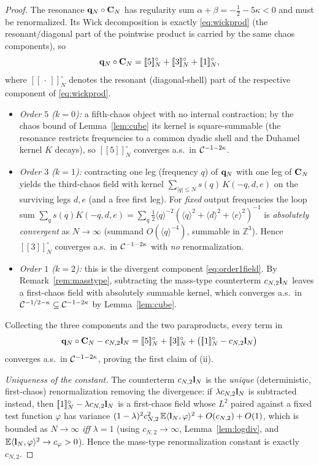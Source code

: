 \begin{proof}
The resonance $\mathbf{q}_N\circ\mathbf{C}_N$ has regularity sum
$\alpha+\beta=-\tfrac12-5\kappa<0$ and must be renormalized. Its Wick decomposition is
exactly \eqref{eq:wickprod} (the resonant/diagonal part of the pointwise product is
carried by the same chaos components), so
\begin{equation}\label{eq:resdecomp}
\mathbf{q}_N\circ\mathbf{C}_N=[\![5]\!]^{\circ}_N+[\![3]\!]^{\circ}_N+[\![1]\!]^{\circ}_N,
\end{equation}
where $[\![\,\cdot\,]\!]^{\circ}_N$ denotes the resonant (diagonal-shell) part of the
respective component of \eqref{eq:wickprod}.
\begin{itemize}
\item \emph{Order $5$ ($k=0$):} a fifth-chaos object with no internal contraction; by
the chaos bound of Lemma~\ref{lem:cube} its kernel is square-summable (the resonance
restricts frequencies to a common dyadic shell and the Duhamel kernel $K$ decays), so
$[\![5]\!]^{\circ}_N$ converges a.s.\ in $\mathcal{C}^{-1-2\kappa}$.
\item \emph{Order $3$ ($k=1$):} contracting one leg (frequency $q$) of $\mathbf{q}_N$ with
one leg of $\mathbf{C}_N$ yields the third-chaos field with kernel
$\sum_{|q|\le N}s(q)\,K(-q,d,e)$ on the surviving legs $d,e$ (and a free first leg).
For \emph{fixed} output frequencies the loop sum
$\sum_q s(q)K(-q,d,e)=\sum_q\tfrac12\langle q\rangle^{-2}(\langle q\rangle^2+\langle d\rangle^2+\langle e\rangle^2)^{-1}$
is \emph{absolutely convergent} as $N\to\infty$ (summand $O(\langle q\rangle^{-4})$,
summable in $\mathbb Z^3$). Hence $[\![3]\!]^{\circ}_N$ converges a.s.\ in
$\mathcal{C}^{-1-2\kappa}$ with \emph{no} renormalization.
\item \emph{Order $1$ ($k=2$):} this is the divergent component
\eqref{eq:order1field}. By Remark~\ref{rem:masstype}, subtracting the mass-type
counterterm $c_{N,2}\mathbf{l}_N$ leaves a first-chaos field with absolutely summable
kernel, which converges a.s.\ in $\mathcal{C}^{-1/2-\kappa}\subseteq\mathcal{C}^{-1-2\kappa}$ by
Lemma~\ref{lem:cube}.
\end{itemize}
Collecting the three components and the two paraproducts, every term in
\[
\mathbf{q}_N\circ\mathbf{C}_N-c_{N,2}\mathbf{l}_N=[\![5]\!]^{\circ}_N+[\![3]\!]^{\circ}_N+\bigl([\![1]\!]^{\circ}_N-c_{N,2}\mathbf{l}_N\bigr)
\]
converges a.s.\ in $\mathcal{C}^{-1-2\kappa}$, proving the first claim of (ii).

\medskip
\emph{Uniqueness of the constant.} The counterterm $c_{N,2}\mathbf{l}_N$ is the
\emph{unique} (deterministic, first-chaos) renormalization removing the divergence:
if $\lambda c_{N,2}\mathbf{l}_N$ is subtracted instead, then $[\![1]\!]^{\circ}_N-\lambda
c_{N,2}\mathbf{l}_N$ is a first-chaos field whose $L^2$ paired against a fixed test
function $\varphi$ has variance
$(1-\lambda)^2 c_{N,2}^2\,\mathbb{E}\langle\mathbf{l}_N,\varphi\rangle^2+O(c_{N,2})+O(1)$, which
is bounded as $N\to\infty$ \emph{iff} $\lambda=1$ (using $c_{N,2}\to\infty$,
Lemma~\ref{lem:logdiv}, and $\mathbb{E}\langle\mathbf{l}_N,\varphi\rangle^2\to c_\varphi>0$). Hence the
mass-type renormalization constant is exactly $c_{N,2}$.


\end{proof}
